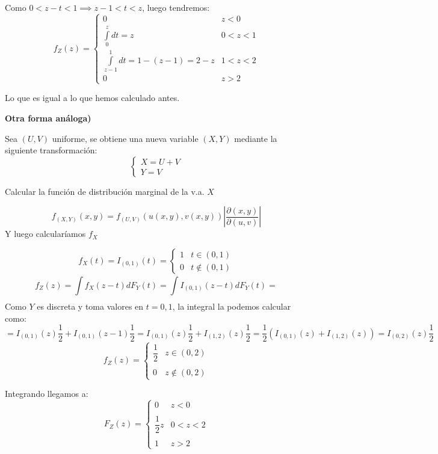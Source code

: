 \documentclass[openany]{book}
\begin{document}
\begin{exercise}
Como $ 0<z-t<1 \implies z-1<t<z $, luego tendremos:
$$ f_{Z}(z) = \left\{
\begin{array}{ll}
    0 & z< 0 \\
    \int\limits_{0}^{z}dt = z & 0<z<1 \\
    \int\limits_{z-1}^{1}dt = 1-(z-1) = 2-z & 1<z<2\\
    0 & z>2 
\end{array}
\right. $$

Lo que es igual a lo que hemos calculado antes.

\textbf{Otra forma análoga)}

Sea $ (U,V) $ uniforme, se obtiene una nueva variable $ (X,Y) $ mediante la siguiente transformación:
$$ \left\{
    \begin{array}{l}
        X = U+V\\
        Y = V
    \end{array}
    \right. $$
    
    Calcular la función de distribución marginal de la v.a. $ X $
    
    $$ f_{(X,Y)}(x,y) = f_{(U,V)} (u(x,y),v(x,y)) |\dfrac{\partial (x,y)}{\partial (u,v)}| $$
    Y luego calcularíamos $ f_{X} $

\end{exercise}


\begin{exercise}
    $$ f_{X}(t) = I_{(0,1)}(t) = \left\{
    \begin{array}{ll}
        1 & t \in (0,1)\\
        0 & t \not \in (0,1)
    \end{array}
    \right. $$
    $$ f_{Z}(z) = \int\limits_{}^{}f_{X}(z-t)dF_{Y}(t) = \int\limits_{}^{}I_{(0,1)}(z-t)dF_{Y}(t) =  $$
    Como $ Y $ es discreta y toma valores en $ t = 0,1 $, la integral la podemos calcular como:
    $$ = I_{(0,1)}(z) \dfrac{1}{2} + I_{(0,1)}(z-1)\dfrac{1}{2} = I_{(0,1)}(z) \dfrac{1}{2} + I_{(1,2)}(z)\dfrac{1}{2} = \dfrac{1}{2}(I_{(0,1)}(z) + I_{(1,2)}(z)) = I_{(0,2)}(z)\dfrac{1}{2}$$
    $$ f_{Z}(z) = \left\{
    \begin{array}{ll}
        \dfrac{1}{2} & z \in (0,2)\\\\
        0 & z \not \in (0,2)
    \end{array}
    \right. $$
    
    Integrando llegamos a:
    $$ F_{Z}(z) = \left\{
    \begin{array}{ll}
        0 & z < 0\\\\
        \dfrac{1}{2}z & 0<z<2\\\\
        1 & z > 2

    \end{array}
    \right. $$
\end{exercise}
\end{document}
